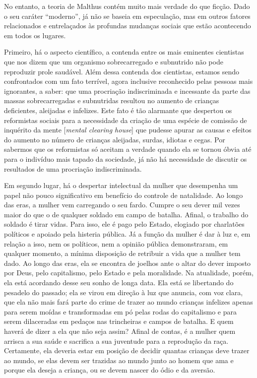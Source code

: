 No entanto, a teoria de Malthus contém muito mais verdade do que ficção.
Dado o seu caráter ``moderno'', já não se baseia em especulação, mas em
outros fatores relacionados e entrelaçados às profundas
mudanças sociais que estão acontecendo em todos os lugares.

Primeiro, há o aspecto científico, a contenda entre os mais eminentes
cientistas que nos dizem que um organismo sobrecarregado e subnutrido
não pode reproduzir prole saudável. Além dessa contenda dos cientistas,
estamos sendo confrontados com um fato terrível, agora inclusive
reconhecido pelas pessoas mais ignorantes, a saber: que uma procriação
indiscriminada e incessante da parte das massas sobrecarregadas e
subnutridas resultou no aumento de crianças deficientes, aleijadas e
infelizes. Este fato é tão alarmante que despertou os reformistas
sociais para a necessidade da criação de uma espécie de comissão de inquérito da mente {[}\textit{mental clearing house}{]} que pudesse apurar as causas e efeitos do aumento
no número de crianças aleijadas, surdas, idiotas e cegas. Por sabermos
que os reformistas só aceitam a verdade quando ela se tornou óbvia até
para o indivíduo mais tapado da sociedade, já não há necessidade de
discutir os resultados de uma procriação indiscriminada.

Em segundo lugar, há o despertar intelectual da mulher que desempenha um
papel não pouco significativo em benefício do controle de natalidade. Ao
longo das eras, a mulher vem carregando o seu fardo. Cumpre o seu dever
mil vezes maior do que o de qualquer soldado em campo de batalha.
Afinal, o trabalho do soldado é tirar vidas. Para isso, ele é pago pelo
Estado, elogiado por charlatões políticos e apoiado pela histeria
pública. Já a função da mulher é dar à luz e, em relação a isso, nem os
políticos, nem a opinião pública demonstraram, em qualquer momento, a
mínima disposição de retribuir a vida que a mulher tem dado. Ao longo
das eras, ela se encontra de joelhos ante o altar do dever imposto por
Deus, pelo capitalismo, pelo Estado e pela moralidade. Na atualidade,
porém, ela está acordando desse seu sonho de longa data. Ela está se
libertando do pesadelo do passado; ela se virou em direção à luz que
anuncia, com voz clara, que ela não mais fará parte do crime de trazer
ao mundo crianças infelizes apenas para serem moídas e transformadas em
pó pelas rodas do capitalismo e para serem dilaceradas em pedaços nas
trincheiras e campos de batalha. E quem haverá de dizer a ela que não
seja assim? Afinal de contas, é a mulher quem arrisca a sua saúde e
sacrifica a sua juventude para a reprodução da raça. Certamente, ela
deveria estar em posição de decidir quantas crianças deve trazer ao
mundo, se elas devem ser trazidas ao mundo junto ao homem que ama e
porque ela deseja a criança, ou se devem nascer do ódio e da aversão.

